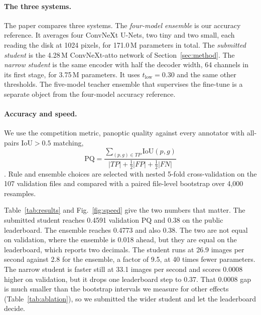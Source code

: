 \documentclass[sigconf]{acmart}
\begin{document}
\paragraph{The three systems.}
The paper compares three systems. The \emph{four-model ensemble} is our accuracy
reference. It averages four ConvNeXt U-Nets, two tiny and two small, each
reading the disk at 1024 pixels, for 171.0\,M parameters in total. The
\emph{submitted student} is the 4.28\,M ConvNeXt-atto network of
Section~\ref{sec:method}. The \emph{narrow student} is the same encoder with half
the decoder width, 64 channels in its first stage, for 3.75\,M parameters. It
uses $t_{\mathrm{low}}=0.30$ and the same other thresholds. The five-model
teacher ensemble that supervises the fine-tune is a separate object from the
four-model accuracy reference.

\paragraph{Accuracy and speed.}
We use the competition metric, panoptic quality against every annotator with
all-pairs IoU$>0.5$ matching,
\begin{equation}
\mathrm{PQ}=\frac{\sum_{(p,g)\in TP}\mathrm{IoU}(p,g)}
{|TP|+\tfrac12|FP|+\tfrac12|FN|}
\label{eq:pq}
\end{equation}
\cite{kirillov2019panoptic}. Rule and ensemble choices are selected with nested
5-fold cross-validation on the 107 validation files and compared with a paired
file-level bootstrap over 4{,}000 resamples.

Table~\ref{tab:results} and Fig.~\ref{fig:speed} give the two numbers that
matter. The submitted student reaches 0.4591 validation PQ and 0.38 on the
public leaderboard. The ensemble reaches 0.4773 and also 0.38. The two are not
equal on validation, where the ensemble is 0.018 ahead, but they are equal on
the leaderboard, which reports two decimals. The student runs at 26.9 images per
second against 2.8 for the ensemble, a factor of 9.5, at 40 times fewer
parameters. The narrow student is faster still at 33.1 images per second and
scores 0.0008 higher on validation, but it drops one leaderboard step to 0.37.
That 0.0008 gap is much smaller than the bootstrap intervals we measure for
other effects (Table~\ref{tab:ablation}), so we submitted the wider student and
let the leaderboard decide.
\end{document}
